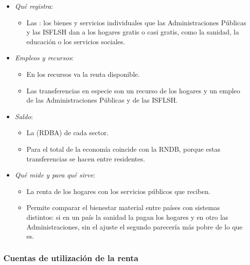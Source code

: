 \documentclass[11pt]{article}
\begin{document}
\begin{itemize}
\item \emph{Qué registra}:
  \begin{itemize}
  \item Las : los bienes y servicios individuales que las Administraciones Públicas y las ISFLSH dan a los hogares gratis o casi gratis, como la sanidad, la educación o los servicios sociales.
  \end{itemize}
\item \emph{Empleos y recursos}:
  \begin{itemize}
  \item En los recursos va la renta disponible.
  \item Las transferencias en especie son un recurso de los hogares y un empleo de las Administraciones Públicas y de las ISFLSH.
  \end{itemize}
\item \emph{Saldo}:
  \begin{itemize}
  \item La  (RDBA) de cada sector.
  \item Para el total de la economía coincide con la RNDB, porque estas transferencias se hacen entre residentes.
  \end{itemize}
\item \emph{Qué mide y para qué sirve}:
  \begin{itemize}
  \item La renta de los hogares con los servicios públicos que reciben.
  \item Permite comparar el bienestar material entre países con sistemas distintos: si en un país la sanidad la pagan los hogares y en otro las Administraciones, sin el ajuste el segundo parecería más pobre de lo que es.
  \end{itemize}
\end{itemize}

\subsubsection{Cuentas de utilización de la renta}\label{sec:utilizacion}
\end{document}
